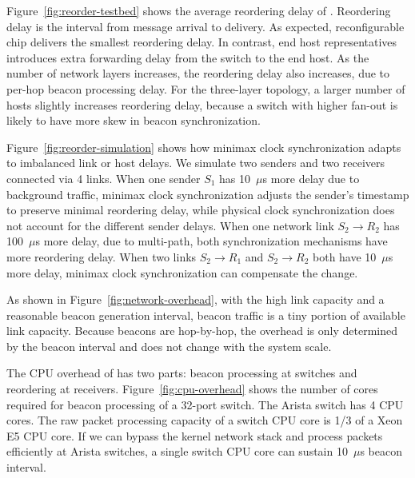 Figure~\ref{fig:reorder-testbed} shows the average reordering delay of \sys.
Reordering delay is the interval from message arrival to delivery. As expected, reconfigurable chip delivers the smallest reordering delay. In contrast, end host representatives introduces extra forwarding delay from the switch to the end host. As the number of network layers increases, the reordering delay also increases, due to per-hop beacon processing delay.
For the three-layer topology, a larger number of hosts slightly increases reordering delay, because a switch with higher fan-out is likely to have more skew in beacon synchronization.

Figure~\ref{fig:reorder-simulation} shows how minimax clock synchronization adapts to imbalanced link or host delays. We simulate two senders and two receivers connected via 4 links. When one sender $S_1$ has 10~$\mu$s more delay due to background traffic, minimax clock synchronization adjusts the sender's timestamp to preserve minimal reordering delay, while physical clock synchronization does not account for the different sender delays. When one network link $S_2 \rightarrow R_2$ has 100~$\mu$s more delay, due to multi-path, both synchronization mechanisms have more reordering delay. When two links $S_2 \rightarrow R_1$ and $S_2 \rightarrow R_2$ both have 10~$\mu$s more delay, minimax clock synchronization can compensate the change.






As shown in Figure~\ref{fig:network-overhead}, with the high link capacity and a reasonable beacon generation interval, beacon traffic is a tiny portion of available link capacity. Because beacons are hop-by-hop, the overhead is only determined by the beacon interval and does not change with the system scale.

The CPU overhead of \sys has two parts: beacon processing at switches and reordering at receivers. Figure~\ref{fig:cpu-overhead} shows the number of cores required for beacon processing of a 32-port switch. The Arista switch has 4 CPU cores. The raw packet processing capacity of a switch CPU core is 1/3 of a Xeon E5 CPU core. If we can bypass the kernel network stack and process packets efficiently at Arista switches, a single switch CPU core can sustain 10~$\mu$s beacon interval.

